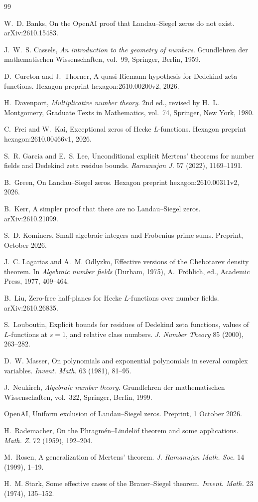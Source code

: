 \documentclass[11pt, reqno, twoside, letterpaper]{amsart}
\begin{document}
\begin{thebibliography}{99}

W.~D. Banks, On the OpenAI proof that Landau--Siegel zeros do not
exist. arXiv:2610.15483.

J.~W.~S. Cassels, \emph{An introduction to the geometry of numbers}.
Grundlehren der mathematischen Wissenschaften, vol.~99, Springer,
Berlin, 1959.

D.~Cureton and J.~Thorner, A quasi-Riemann hypothesis for Dedekind
zeta functions. Hexagon preprint hexagon:2610.00200v2, 2026.

H.~Davenport, \emph{Multiplicative number theory}. 2nd ed., revised by
H.~L. Montgomery, Graduate Texts in Mathematics, vol.~74, Springer,
New York, 1980.

C.~Frei and W.~Kai, Exceptional zeros of Hecke $L$-functions. Hexagon
preprint hexagon:2610.00466v1, 2026.

S.~R. Garcia and E.~S. Lee, Unconditional explicit Mertens' theorems
for number fields and Dedekind zeta residue bounds.
\emph{Ramanujan J.} 57 (2022), 1169--1191.

B.~Green, On Landau--Siegel zeros. Hexagon preprint
hexagon:2610.00311v2, 2026.

B.~Kerr, A simpler proof that there are no Landau--Siegel zeros.
arXiv:2610.21099.

S.~D. Kominers, Small algebraic integers and Frobenius prime sums.
Preprint, October 2026.

J.~C. Lagarias and A.~M. Odlyzko, Effective versions of the Chebotarev
density theorem. In \emph{Algebraic number fields} (Durham, 1975),
A.~Fr\"ohlich, ed., Academic Press, 1977, 409--464.

B.~Liu, Zero-free half-planes for Hecke $L$-functions over number
fields. arXiv:2610.26835.

S.~Louboutin, Explicit bounds for residues of Dedekind zeta
functions, values of $L$-functions at $s=1$, and relative class
numbers. \emph{J. Number Theory} 85 (2000), 263--282.

D.~W. Masser, On polynomials and exponential polynomials in several
complex variables. \emph{Invent. Math.} 63 (1981), 81--95.

J.~Neukirch, \emph{Algebraic number theory}. Grundlehren der
mathematischen Wissenschaften, vol.~322, Springer, Berlin, 1999.

OpenAI, Uniform exclusion of Landau--Siegel zeros. Preprint, 1 October
2026.

H.~Rademacher, On the Phragm\'en--Lindel\"of theorem and some
applications. \emph{Math. Z.} 72 (1959), 192--204.

M.~Rosen, A generalization of Mertens' theorem. \emph{J. Ramanujan
Math. Soc.} 14 (1999), 1--19.

H.~M. Stark, Some effective cases of the Brauer--Siegel theorem.
\emph{Invent. Math.} 23 (1974), 135--152.

\end{thebibliography}
\end{document}
